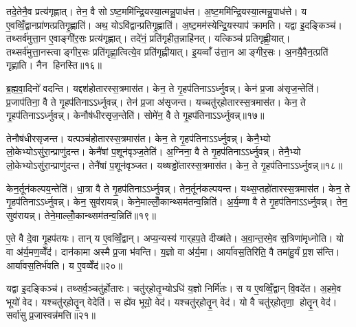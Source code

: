 तदे॒तेनै॒व प्रत्य॑गृह्णात्। तेन॒ वै सोऽष्ट॒ममि॑न्द्रि॒यस्या॒त्मन्नु॒पाध॑त्त। अ॒ष्ट॒ममि॑न्द्रि॒यस्या॒त्मन्नु॒पाध॑त्ते। य ए॒वव्विँ॒द्वानप्रा॑णत्प्रतिगृ॒ह्णाति॑। अथ॒ योऽवि॑द्वान्प्रतिगृ॒ह्णाति॑। अ॒ष्ट॒मम॑स्येन्द्रि॒यस्याप॑ क्रामति। यद्वा इ॒दङ्किञ्च॑। तथ्सर्व॑मुत्ता॒न ए॒वाङ्गी॑र॒सः प्रत्य॑गृह्णात्। तदे॑नं॒ प्रति॑गृहीत॒न्नाहि॑नत्। यत्किञ्च॑ प्रतिगृह्णी॒यात्। तथ्सर्व॑मुत्ता॒नस्त्वाङ्गीर॒सः प्रति॑गृह्णा॒त्वित्ये॒व प्रति॑गृह्णीयात्। इ॒यव्वाँ उ॑त्ता॒न आङ्गीर॒सः। अ॒नयै॒वैन॒त्प्रति॑ गृह्णाति। नैन हिनस्ति॥१६॥\anuvakamend[तृती॑यमिन्द्रि॒यस्यापाक्रामच्चतु॒र्थमि॑न्द्रि॒यस्या॒त्मन्नु॒पाध॒त्ताश्वं॑ प्रतिगृ॒ह्णाति॑ ष॒ष्ठम॑स्येन्द्रि॒यस्याप॑क्रामत्यष्ट॒ममि॑न्द्रि॒यस्यापाक्रामत्प्रतिगृह्णी॒याच्च॒त्वारि॑ च (तस्य॒ वा अ॒ग्नेर्‌हिर॑ण्य॒ सोम॑स्य॒ वास॒स्तदे॒तेन॑ रु॒द्रस्य॒ गान्तामे॒तेन॒ वरु॑ण॒स्याश्वं॑ प्र॒जाप॑ते॒ पुरु॑षं॒ मनो॒स्तल्प॒न्तमे॒तेनोत्ता॒नस्य॒ तदे॒तेनाप्रा॑ण॒द्यद्वै। अ॒र्धं तृती॑यमष्ट॒मं तच्च॑तु॒र्थं तां प॑ञ्च॒म ष॒ष्ठ स॑प्त॒मन्तम्। तदे॒तेन॒ द्वे तामे॒तेनैकं॒ तमे॒तेन॒ त्रीणि॒ तदे॒तेनैकम् ॥ )]

ब्र॒ह्म॒वा॒दिनो॑ वदन्ति। यद्दश॑होतारस्स॒त्रमास॑त। केन॒ ते गृ॒हप॑तिनाऽऽर्ध्नुवन्न्। केन॑ प्र॒जा अ॑सृज॒न्तेति॑। प्र॒जाप॑तिना॒ वै ते गृ॒हप॑तिनाऽऽर्ध्नुवन्न्। तेन॑ प्र॒जा अ॑सृजन्त। यच्चतु॑र्‌होतारस्स॒त्रमास॑त। केन॒ ते गृ॒हप॑तिनाऽऽर्ध्नुवन्न्। केनौष॑धीरसृज॒न्तेति॑। सोमे॑न॒ वै ते गृ॒हप॑तिनाऽऽर्ध्नुवन्न्॥१७॥

तेनौष॑धीरसृजन्त। यत्पञ्च॑होतारस्स॒त्रमास॑त। केन॒ ते गृ॒हप॑तिनाऽऽर्ध्नुवन्न्। केनै॒भ्यो लो॒केभ्योऽसु॑रा॒न्प्राणु॑दन्त। केनै॑षां प॒शून॑वृञ्ज॒तेति॑। अ॒ग्निना॒ वै ते गृ॒हप॑तिनाऽऽर्ध्नुवन्न्। तेनै॒भ्यो लो॒केभ्योऽसु॑रा॒न्प्राणु॑दन्त। तेनै॑षां प॒शून॑वृञ्जत। यथ्षड्ढो॑तारस्स॒त्रमास॑त। केन॒ ते गृ॒हप॑तिनाऽऽर्ध्नुवन्न्॥१८॥

केन॒र्तून॑कल्पय॒न्तेति॑। धा॒त्रा वै ते गृ॒हप॑तिनाऽऽर्ध्नुवन्न्। तेन॒र्तून॑कल्पयन्त। यथ्स॒प्तहो॑तारस्स॒त्रमास॑त। केन॒ ते गृ॒हप॑तिनाऽऽर्ध्नुवन्न्। केन॒ सुव॑रायन्न्। केने॒माल्लोँ॒कान्थ्सम॑तन्व॒न्निति॑। अ॒र्य॒म्णा वै ते गृ॒हप॑तिनाऽऽर्ध्नुवन्न्। तेन॒ सुव॑रायन्न्। तेने॒माल्लोँ॒कान्थ्सम॑तन्व॒न्निति॑॥१९॥

ए॒ते वै दे॒वा गृ॒हप॑तयः। तान् य ए॒वव्विँ॒द्वान्। अप्य॒न्यस्य॑ गार्‌हप॒ते दीख्ष॑ते। अ॒वा॒न्त॒रमे॒व स॒त्रिणा॑मृध्नोति। यो वा अ॑र्य॒मण॒व्वेँद॑। दान॑कामा अस्मै प्र॒जा भ॑वन्ति। य॒ज्ञो वा अ॑र्य॒मा। आर्या॑वस॒तिरिति॒ वै तमा॑हु॒र्यं प्र॒शस॑न्ति। आर्या॑वस॒तिर्भ॑वति। य ए॒वव्वेँद॑॥२०॥

यद्वा इ॒दङ्किञ्च॑। तथ्सर्व॒ञ्चतु॑र्\mbox{}होतारः। चतु॑र्‌होतृ॒भ्योऽधि॑ य॒ज्ञो निर्मि॑तः। स य ए॒वव्विँ॒द्वान्‌ वि॒वदे॑त। अ॒हमे॒व भूयो॑ वेद। यश्चतु॑र्‌होतॄ॒न् वेदेति॑। स ह्ये॑व भूयो॒ वेद॑। यश्चतु॑र्‌होतॄ॒न् वेद॑। यो वै चतु॑र्‌होतृणा॒ होतॄ॒न् वेद॑। सर्वा॑सु प्र॒जास्वन्न॑मत्ति॥२१॥

